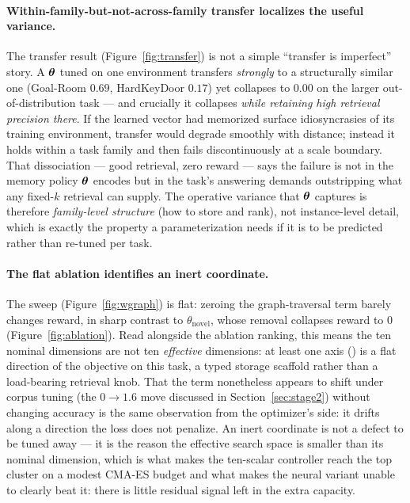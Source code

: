 \paragraph{Within-family-but-not-across-family transfer localizes the useful
variance.} The transfer result (Figure~\ref{fig:transfer}) is not a simple
``transfer is imperfect'' story. A $\boldsymbol{\theta}$ tuned on one environment transfers
\emph{strongly} to a structurally similar one (Goal-Room $0.69$, HardKeyDoor
$0.17$) yet collapses to $0.00$ on the larger out-of-distribution task --- and
crucially it collapses \emph{while retaining high retrieval precision there}. If
the learned vector had memorized surface idiosyncrasies of its training
environment, transfer would degrade smoothly with distance; instead it holds
within a task family and then fails discontinuously at a scale boundary. That
dissociation --- good retrieval, zero reward --- says the failure is not in the
memory policy $\boldsymbol{\theta}$ encodes but in the task's answering demands outstripping
what any fixed-$k$ retrieval can supply. The operative variance that $\boldsymbol{\theta}$
captures is therefore \emph{family-level structure} (how to store and rank), not
instance-level detail, which is exactly the property a parameterization needs if
it is to be predicted rather than re-tuned per task.

\paragraph{The flat \wgraph{} ablation identifies an inert coordinate.} The
\wgraph{} sweep (Figure~\ref{fig:wgraph}) is flat: zeroing the graph-traversal
term barely changes reward, in sharp contrast to $\theta_{\mathrm{novel}}$, whose
removal collapses reward to $0$ (Figure~\ref{fig:ablation}). Read alongside the
ablation ranking, this means the ten nominal dimensions are not ten
\emph{effective} dimensions: at least one axis (\wgraph{}) is a flat direction of
the objective on this task, a typed storage scaffold rather than a load-bearing
retrieval knob. That the term nonetheless appears to shift under corpus tuning
(the $0\rightarrow1.6$ move discussed in Section~\ref{sec:stage2}) without
changing accuracy is the same observation from the optimizer's side: it drifts
along a direction the loss does not penalize. An inert coordinate is not a defect
to be tuned away --- it is the reason the effective search space is smaller than
its nominal dimension, which is what makes the ten-scalar controller reach the
top cluster on a modest CMA-ES budget and what makes the neural variant unable to
clearly beat it: there is little residual signal left in the extra capacity.

